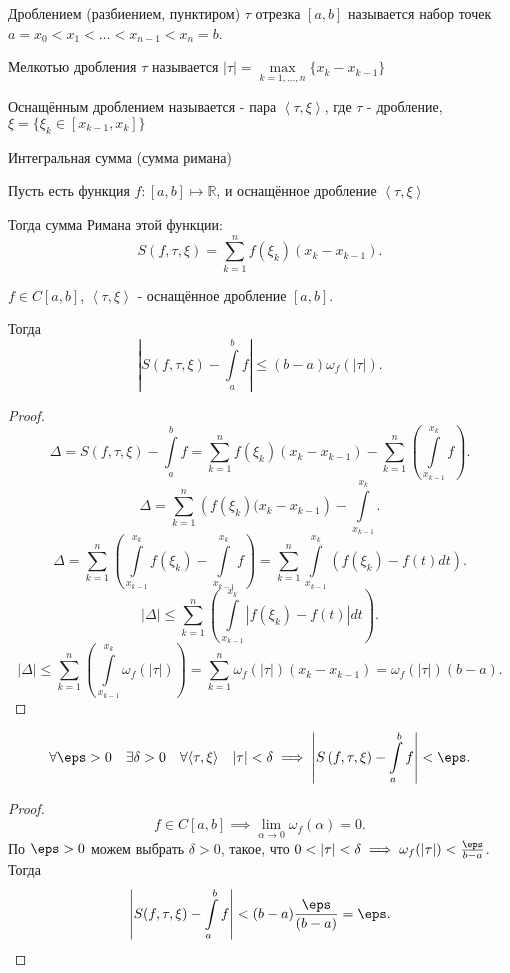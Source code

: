 \begin{definition} 
    Дроблением (разбиением, пунктиром) $\tau$ отрезка $\left[a, b\right]$ называется набор точек $a=x_0 < x_1 < \ldots < x_{n-1} < x_n = b$.
\end{definition}
\begin{definition} 
    Мелкотью дробления $\tau$ называется $|\tau| = \max\limits_{k=1, \ldots, n} \{x_{k} - x_{k-1}\} $
\end{definition}
\begin{definition} 
    Оснащённым дроблением называется - пара $\left<\tau, \xi\right>$, где $\tau$ - дробление, $\xi = \{\xi_{k}\in \left[x_{k-1}, x_k\right]\} $
\end{definition}
\begin{definition} 
    Интегральная сумма (сумма римана)

    Пусть есть функция $f : [a, b] \mapsto \mathbb{R}$, и оснащённое дробление $\left<\tau, \xi\right>$

    Тогда сумма Римана этой функции:
    \[ S(f, \tau, \xi) = \sum\limits_{k=1}^{n} f(\xi_k)(x_{k}-x_{k-1}) .\] 
\end{definition}
\begin{theorem} 
    $f\in C\left[a, b\right]$, $\left<\tau, \xi\right>$ - оснащённое дробление $\left[a, b\right]$.

    Тогда 
    \[ |S(f, \tau, \xi) - \int\limits_{a}^{b} f| \le (b-a)\omega_{f}(|\tau|) .\]
    \begin{proof}
        \[ \Delta = S(f, \tau, \xi) - \int\limits_{a}^{b} f  = \sum\limits_{k=1}^{n} f(\xi_{k})(x_{k}-x_{k-1}) - \sum\limits_{k=1}^{n} \left( \int\limits_{x_{k-1}}^{x_k} f  \right) .\]
        \[ \Delta = \sum\limits_{k=1}^{n} \left( f(\xi_{k})(x_{k}-x_{k-1} \right) - \int\limits_{x_{k-1}}^{x_{k}}    .\]
        \[ \Delta = \sum\limits_{k=1}^{n} \left( \int\limits_{x_{k-1}}^{x_{k}} f(\xi_k) - \int\limits_{x_{k-1}}^{x_k} f    \right) = \sum\limits_{k=1}^{n} \int\limits_{x_{k-1}}^{x_k} \left( f(\xi_{k}) - f(t) dt \right)     .\]
        \[ |\Delta| \le  \sum\limits_{k=1}^{n} \left( \int\limits_{x_{k-1}}^{x_k} |f(\xi_k) - f(t)|dt   \right)  .\]
        \[ |\Delta| \le \sum\limits_{k=1}^{n} \left( \int\limits_{x_{k-1}}^{x_{k}} \omega_{f}(|\tau|)   \right)  = \sum\limits_{k=1}^{n} \omega_{f}(|\tau|)(x_{k}-x_{k-1}) = \omega_{f}(|\tau|)(b-a).\] 
    \end{proof}
\end{theorem}
\begin{consequence} 
    \[ \forall{\eps > 0}\quad \exists{\delta > 0}\quad \forall{\left<\tau, \xi\right>}\quad |\tau| < \delta \implies \left|S\left( f, \tau, \xi \right) - \int\limits_{a}^{b} f\right| < \eps   .\] 
    \begin{proof}
        \[ f\in C\left[a, b\right] \implies \lim\limits_{\alpha \to  0} \omega_{f}(\alpha) = 0 .\]
        По $\eps > 0$ можем выбрать $\delta > 0$, такое, что $0 < |\tau| < \delta \implies \omega_{f}(|\tau|) < \frac{\eps}{b-a}$.
        Тогда
        \[ \left|S(f, \tau, \xi) - \int\limits_{a}^{b} f\right| < (b-a) \frac{\eps}{(b-a)} = \eps  .\qedhere\] 
    \end{proof}
\end{consequence}
